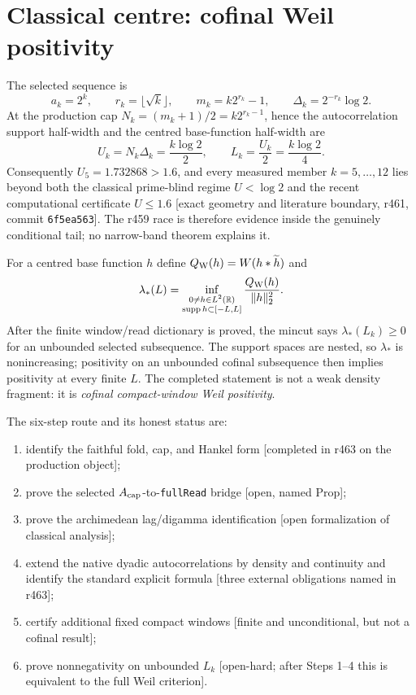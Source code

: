 \documentclass[11pt]{article}
\theoremstyle{remark}
\newcommand{\R}{\mathbb{R}}
\newcommand{\gr}[1]{\textnormal{\small[#1]}}
\begin{document}
\section{Classical centre: cofinal Weil positivity}\label{sec:r461}

The selected sequence is
\[
a_{k}=2^{k},\qquad r_{k}=\lfloor\sqrt{k}\rfloor,\qquad
m_{k}=k2^{r_{k}}-1,\qquad
\Delta_{k}=2^{-r_{k}}\log2 .
\]
At the production cap
$N_{k}=(m_{k}+1)/2=k2^{r_{k}-1}$, hence the autocorrelation support
half-width and the centred base-function half-width are
\[
U_{k}=N_{k}\Delta_{k}=\frac{k\log2}{2},
\qquad L_{k}=\frac{U_{k}}2=\frac{k\log2}{4}.
\]
Consequently $U_{5}=1.732868>1.6$, and every measured member
$k=5,\ldots,12$ lies beyond both the classical prime-blind regime
$U<\log2$ and the recent computational certificate $U\le1.6$
\gr{exact geometry and literature boundary, r461,
commit \texttt{6f5ea563}}.  The r459 race is therefore evidence
inside the genuinely conditional tail; no narrow-band theorem
explains it.

For a centred base function $h$ define
$Q_{\rm W}(h)=W(h*\widetilde h)$ and
\[
\lambda_{*}(L)=
\inf_{\substack{0\ne h\in L^{2}(\R)\\
\operatorname{supp}h\subset[-L,L]}}
\frac{Q_{\rm W}(h)}{\|h\|_{2}^{2}}.
\]
After the finite window/read dictionary is proved, the mincut says
$\lambda_{*}(L_{k})\ge0$ for an unbounded selected subsequence.
The support spaces are nested, so $\lambda_{*}$ is nonincreasing;
positivity on an unbounded cofinal subsequence then implies
positivity at every finite $L$.  The completed statement is not a
weak density fragment: it is \emph{cofinal compact-window Weil
positivity}.

The six-step route and its honest status are:
\begin{enumerate}
\item identify the faithful fold, cap, and Hankel form
      \gr{completed in r463 on the production object};
\item prove the selected $A_{\rm cap}$-to-\texttt{fullRead} bridge
      \gr{open, named Prop};
\item prove the archimedean lag/digamma identification
      \gr{open formalization of classical analysis};
\item extend the native dyadic autocorrelations by density and
      continuity and identify the standard explicit formula
      \gr{three external obligations named in r463};
\item certify additional fixed compact windows
      \gr{finite and unconditional, but not a cofinal result};
\item prove nonnegativity on unbounded $L_{k}$
      \gr{open-hard; after Steps 1--4 this is equivalent to the full
      Weil criterion}.
\end{enumerate}
\end{document}
